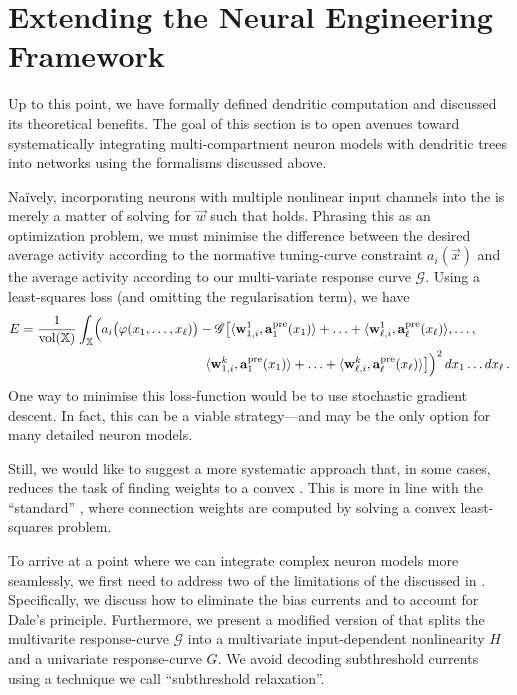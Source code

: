 
\section{Extending the Neural Engineering Framework}
\label{sec:nef_extension}

Up to this point, we have formally defined dendritic computation and discussed its theoretical benefits.
The goal of this section is to open avenues toward systematically integrating multi-compartment neuron models with dendritic trees into \NEF networks using the formalisms discussed above.

Na\"ively, incorporating neurons with multiple nonlinear input channels into the \NEF is merely a matter of solving for $\vec w$ such that  holds.
Phrasing this as an optimization problem, we must minimise the difference between the desired average activity according to the normative tuning-curve constraint $a_i(\vec x)$ and the average activity according to our multi-variate response curve $\mathscr{G}$.
Using a least-squares loss (and omitting the regularisation term), we have
\begin{align}
	\begin{aligned}
	E &=
	\frac{1}{\vol(\Xrepr)} \int_{\Xrepr} \Bigl( a_i\bigl(\phi(x_1, \ldots, x_\ell)\bigr) -
	\mathscr{G} \bigl[
		\langle \vec w_{1, i}^1, \vec a^\mathrm{pre}_1(x_1) \rangle + \ldots +
		\langle \vec w_{\ell, i}^1, \vec a^\mathrm{pre}_\ell(x_\ell) \rangle, \ldots,\\
	&~\hspace{13.825em}
		\langle \vec w_{1, i}^k, \vec a^\mathrm{pre}_1(x_1) \rangle + \ldots +
		\langle \vec w_{\ell, i}^k, \vec a^\mathrm{pre}_\ell(x_\ell) \rangle
	\bigr] \Bigr)^2 \,dx_1 \ldots dx_\ell \,.
	\end{aligned}
	\label{eqn:dendritic_computation_optimisation}
\end{align}
One way to minimise this loss-function would be to use stochastic gradient descent.
In fact, this can be a viable strategy---and may be the only option for many detailed neuron models.

Still, we would like to suggest a more systematic approach that, in some cases, reduces the task of finding weights to a convex \qprog.
This is more in line with the \enquote{standard} \NEF, where connection weights are computed by solving a convex least-squares problem.

To arrive at a point where we can integrate complex neuron models more seamlessly, we first need to address two of the limitations of the \NEF discussed in .
Specifically, we discuss how to eliminate the bias currents and to account for Dale's principle.
Furthermore, we present a modified version of  that splits the multivarite response-curve $\mathscr{G}$ into a multivariate input-dependent nonlinearity $H$ and a univariate response-curve $G$.
We avoid decoding subthreshold currents using a technique we call \enquote{subthreshold relaxation}.

